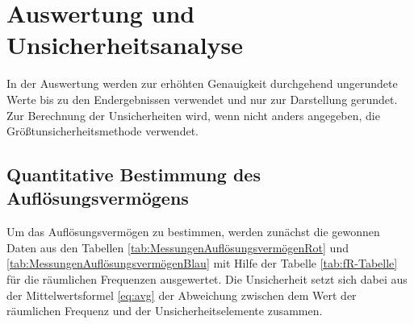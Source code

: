 \documentclass[12pt,a4paper,twoside]{article}
\begin{document}
\section{Auswertung und Unsicherheitsanalyse} %

In der Auswertung werden zur erhöhten Genauigkeit durchgehend ungerundete Werte bis zu den Endergebnissen verwendet und nur zur Darstellung gerundet. \\
Zur Berechnung der Unsicherheiten wird, wenn nicht anders angegeben, die Größtunsicherheitsmethode verwendet.


\subsection{Quantitative Bestimmung des Auflösungsvermögens}

Um das Auflösungsvermögen zu bestimmen, werden zunächst die gewonnen Daten aus den Tabellen \ref{tab:MessungenAuflösungsvermögenRot} und \ref{tab:MessungenAuflösungsvermögenBlau} mit Hilfe der Tabelle \ref{tab:fR-Tabelle} für die räumlichen Frequenzen ausgewertet.
Die Unsicherheit setzt sich dabei aus der Mittelwertsformel \ref{eq:avg} der Abweichung zwischen dem Wert der räumlichen Frequenz und der Unsicherheitselemente zusammen.

\begin{table}[H]
    \centering
    \caption{Umrechnen in die räumliche Frequenz für rotes Licht}
    \label{tab:MessungenRäumliche FrequenzRot}
\end{table}

\begin{table}[H]
    \centering
    \caption{Umrechnen in die räumliche Frequenz für blaues Licht}
    \label{tab:MessungenRäumlicheFrequenzBlau}
\end{table}
\end{document}
